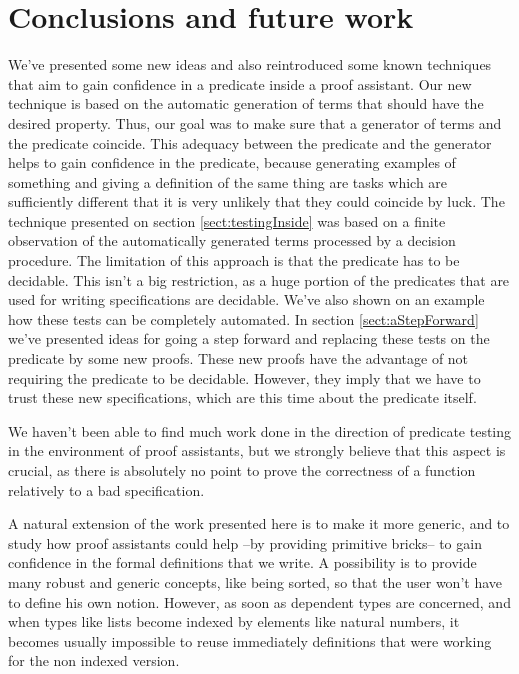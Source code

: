 \section{Conclusions and future work}


We've presented some new ideas and also reintroduced some known techniques that aim to gain confidence in a predicate inside a proof assistant. Our new technique is based on the automatic generation of terms that should have the desired property. Thus, our goal was to make sure that a generator of terms and the predicate coincide. This adequacy between the predicate and the generator helps to gain confidence in the predicate, because generating examples of something and giving a definition of the same thing are tasks which are sufficiently different that it is very unlikely that they could coincide by luck. The technique presented on section \ref{sect:testingInside} was based on a finite observation of the automatically generated terms processed by a decision procedure. The limitation of this approach is that the predicate has to be decidable. This isn't a big restriction, as a huge portion of the predicates that are used for writing specifications are decidable. We've also shown on an example how these tests can be completely automated. In section \ref{sect:aStepForward} we've presented ideas for going a step forward and replacing these tests on the predicate by some new proofs. These new proofs have the advantage of not requiring the predicate to be decidable. However, they imply that we have to trust these new specifications, which are this time about the predicate itself.

We haven't been able to find much work done in the direction of predicate testing in the environment of proof assistants, but we strongly believe that this aspect is crucial, as there is absolutely no point to prove the correctness of a function relatively to a bad specification. 

A natural extension of the work presented here is to make it more generic, and to study how proof assistants could help --by providing primitive bricks-- to gain confidence in the formal definitions that we write. A possibility is to provide many robust and generic concepts, like being sorted, so that the user won't have to define his own notion. However, as soon as dependent types are concerned, and when types like lists become indexed by elements like natural numbers, it becomes usually impossible to reuse immediately definitions that were working for the non indexed version.

